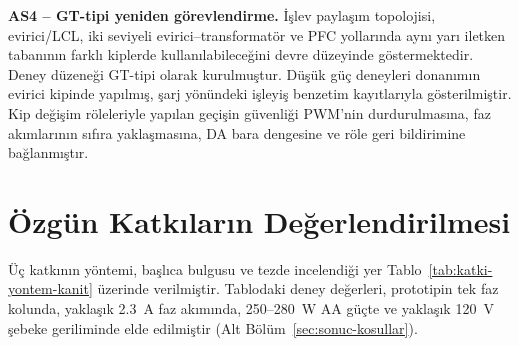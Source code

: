 \textbf{AS4 -- GT-tipi yeniden görevlendirme.} İşlev paylaşım topolojisi, evirici/LCL, iki seviyeli evirici--transformatör ve PFC yollarında aynı yarı iletken tabanının farklı kiplerde kullanılabileceğini devre düzeyinde göstermektedir. Deney düzeneği GT-tipi olarak kurulmuştur. Düşük güç deneyleri donanımın evirici kipinde yapılmış, şarj yönündeki işleyiş benzetim kayıtlarıyla gösterilmiştir. Kip değişim röleleriyle yapılan geçişin güvenliği PWM'nin durdurulmasına, faz akımlarının sıfıra yaklaşmasına, DA bara dengesine ve röle geri bildirimine bağlanmıştır.

\section{Özgün Katkıların Değerlendirilmesi}

Üç katkının yöntemi, başlıca bulgusu ve tezde incelendiği yer Tablo~\ref{tab:katki-yontem-kanit} üzerinde verilmiştir. Tablodaki deney değerleri, prototipin tek faz kolunda, yaklaşık \SI{2.3}{\ampere} faz akımında, \num{250}--\SI{280}{\watt} AA güçte ve yaklaşık \SI{120}{\volt} şebeke geriliminde elde edilmiştir (Alt Bölüm~\ref{sec:sonuc-kosullar}).

